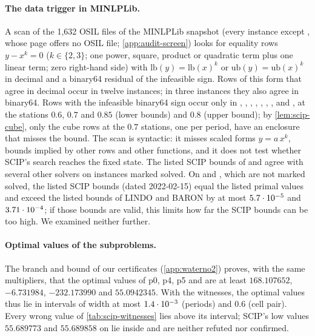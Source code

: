 \paragraph{The data trigger in MINLPLib.}
A scan of the 1,632 OSIL files of the MINLPLib snapshot (every instance except , whose page offers no OSIL file; \cref{app:audit-screen}) looks for equality rows $y-x^k=0$ ($k\in\{2,3\}$; one power, square, product or quadratic term plus one linear term; zero right-hand side) with $\mathrm{lb}(y)=\mathrm{lb}(x)^k$ or $\mathrm{ub}(y)=\mathrm{ub}(x)^k$ in decimal and a binary64 residual of the infeasible sign.
Rows of this form that agree in decimal occur in twelve instances; in three  instances they also agree in binary64.
Rows with the infeasible binary64 sign occur only in , , , , , , ,  and , at the stations $0.6$, $0.7$ and $0.85$ (lower bounds) and $0.8$ (upper bound); by \cref{lem:scip-cube}, only the cube rows at the $0.7$ stations, one per period, have an enclosure that misses the bound.
The scan is syntactic: it misses scaled forms $y=a\,x^k$, bounds implied by other rows and other functions, and it does not test whether SCIP's search reaches the fixed state.
The listed SCIP bounds of  and  agree with several other solvers on instances marked solved.
On  and , which are not marked solved, the listed SCIP bounds (dated 2022-02-15) equal the listed primal values and exceed the listed bounds of LINDO and BARON by at most $5.7\cdot 10^{-5}$ and $3.71\cdot 10^{-4}$; if those bounds are valid, this limits how far the SCIP bounds can be too high.
We examined neither further.

\paragraph{Optimal values of the subproblems.}
The branch and bound of our  certificates (\cref{app:waterno2}) proves, with the same multipliers, that the optimal values of p0, p4, p5 and  are at least $168.107652$, $-6.731984$, $-232.173990$ and $55.0942345$.
With the witnesses, the optimal values thus lie in intervals of width at most $1.4\cdot 10^{-3}$ (periods) and $0.6$ (cell pair).
Every wrong value of \cref{tab:scip-witnesses} lies above its interval; SCIP's low values $55.689773$ and $55.689858$ on  lie inside and are neither refuted nor confirmed.

